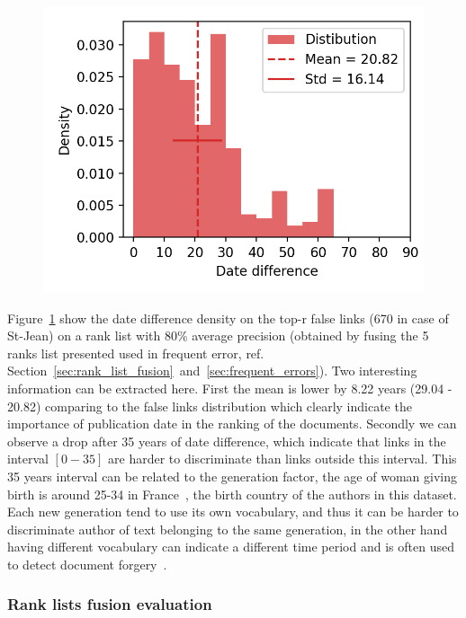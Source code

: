 \begin{figure}
  \label{fig:dates_differences_r_false}
  \includegraphics[width=\linewidth]{img/dates_differences_r_false.png}
\end{figure}

Figure~\ref{fig:dates_differences_r_false} show the date difference density on the top-r false links (670 in case of St-Jean) on a rank list with 80\% average precision (obtained by fusing the 5 ranks list presented used in frequent error, ref. Section~\ref{sec:rank_list_fusion}~and~\ref{sec:frequent_errors}).
Two interesting information can be extracted here.
First the mean is lower by 8.22 years (29.04 - 20.82) comparing to the false links distribution which clearly indicate the importance of publication date in the ranking of the documents.
Secondly we can observe a drop after 35 years of date difference, which indicate that links in the interval $\left[0-35\right]$ are harder to discriminate than links outside this interval.
This 35 years interval can be related to the generation factor, the age of woman giving birth is around 25-34 in France~\cite{generations}, the birth country of the authors in this dataset.
Each new generation tend to use its own vocabulary, and thus it can be harder to discriminate author of text belonging to the same generation, in the other hand having different vocabulary can indicate a different time period and is often used to detect document forgery~\cite{savoy_stylo}.

\subsubsection{Rank lists fusion evaluation}

